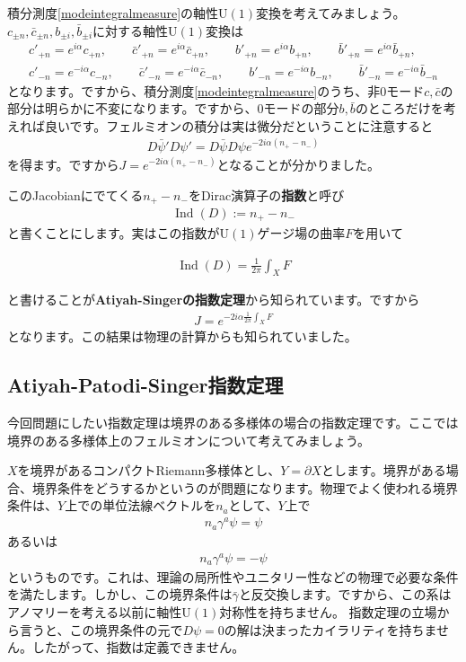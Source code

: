 \documentclass[paper=a4, fontsize=12pt, line_length=16cm, number_of_lines=33,dvipdfmx]{jlreq}
\numberwithin{equation}{section}
\newcommand{\del}{\partial}
\newcommand{\strong}[1]{\textsf{\bfseries #1}}
\newcommand{\psib}{\bar{\psi}}
\newcommand{\gammab}{\bar{\gamma}}
\newcommand{\cb}{\bar{c}}
\newcommand{\bb}{\bar{b}}
\newcommand{\U}{\mathrm{U}}
\DeclareMathOperator{\Ind}{\mathrm{Ind}}
\newenvironment{important}{\begin{tcolorbox}[
  colback = white,
  colframe = red!35,
  boxrule = 2mm,
  fonttitle = \bfseries,
  after = \noindent] }{\end{tcolorbox}}
\begin{document}
積分測度\eqref{modeintegralmeasure}の軸性$\U(1)$変換を考えてみましょう。$c_{\pm n},\cb_{\pm n}, b_{\pm i},\bb_{\pm i}$に対する軸性$\U(1)$変換は
\begin{align}
  c'_{+n}=e^{i\alpha}c_{+n},\qquad \cb'_{+n}=e^{i\alpha}\cb_{+n},\qquad
  b'_{+n}=e^{i\alpha}b_{+n},\qquad \bb'_{+n}=e^{i\alpha}\bb_{+n},\nonumber\\  
  c'_{-n}=e^{-i\alpha}c_{-n},\qquad \cb'_{-n}=e^{-i\alpha}\cb_{-n},\qquad
  b'_{-n}=e^{-i\alpha}b_{-n},\qquad \bb'_{-n}=e^{-i\alpha}\bb_{-n}
\end{align}
となります。ですから、積分測度\eqref{modeintegralmeasure}のうち、非0モード$c,\cb$の部分は明らかに不変になります。ですから、0モードの部分$b,\bb$のところだけを考えれば良いです。フェルミオンの積分は実は微分だということに注意すると
\begin{align}
  D\psib' D\psi'=D\psib D\psi e^{-2i\alpha(n_{+}-n_{-})}\label{Jacobian2}
\end{align}
を得ます。ですから$J=e^{-2i\alpha(n_{+}-n_{-})}$となることが分かりました。

このJacobianにでてくる$n_{+}-n_{-}$をDirac演算子の\strong{指数}と呼び
\begin{align}
  \Ind(D):=n_{+}-n_{-}\label{defindex}
\end{align}
と書くことにします。実はこの指数が$\U(1)$ゲージ場の曲率$F$を用いて
\begin{important}
  \begin{align}
    \Ind(D)=\frac{1}{2\pi}\int_{X}F
  \end{align}
\end{important}
と書けることが\strong{Atiyah-Singerの指数定理}\cite{Atiyah:1963zz,Atiyah:1968mp}から知られています。ですから
\begin{align}
  J=e^{-2i\alpha \frac{1}{2\pi}\int_{X}F}
\end{align}
となります。この結果は物理の計算\cite{Adler:1969gk,Bell:1969ts,Fujikawa:1979ay}からも知られていました。


\subsection{Atiyah-Patodi-Singer指数定理}
今回問題にしたい指数定理は境界のある多様体の場合の指数定理です。ここでは境界のある多様体上のフェルミオンについて考えてみましょう。

$X$を境界があるコンパクトRiemann多様体とし、$Y=\del X$とします。境界がある場合、境界条件をどうするかというのが問題になります。物理でよく使われる境界条件は、$Y$上での単位法線ベクトルを$n_{a}$として、$Y$上で
\begin{align}
  n_{a}\gamma^{a}\psi=\psi
\end{align}
あるいは
\begin{align}
  n_{a}\gamma^{a}\psi=-\psi
\end{align}
というものです。これは、理論の局所性やユニタリー性などの物理で必要な条件を満たします。しかし、この境界条件は$\gammab$と反交換します。ですから、この系はアノマリーを考える以前に軸性$\U(1)$対称性を持ちません。
指数定理の立場から言うと、この境界条件の元で$D\psi=0$の解は決まったカイラリティを持ちません。したがって、指数は定義できません。
\end{document}
